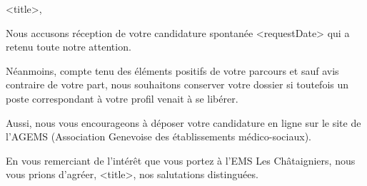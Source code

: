 
<title>,

Nous accusons réception de votre candidature spontanée <requestDate> qui a retenu toute notre attention.

Néanmoins, compte tenu des éléments positifs de votre parcours et sauf avis contraire de votre part, nous souhaitons conserver votre dossier si toutefois un poste correspondant à votre profil venait à se libérer.

Aussi, nous vous encourageons à déposer votre candidature en ligne sur le site de l’AGEMS (Association Genevoise des établissements médico-sociaux).

En vous remerciant de l’intérêt que vous portez à l’EMS Les Châtaigniers, nous vous prions d’agréer, <title>, nos salutations distinguées.



